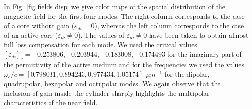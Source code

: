 \documentclass[9pt,twocolumn,twoside]{osajnl}
\begin{document}

In Fig. \ref{fig fields disp} we  give color maps of the spatial distribution of the magnetic field 
for the first four modes. The right column corresponds to the case of a core without gain ($\varepsilon_{di}=0$), whereas the left column corresponds to the case of an active core  ($\varepsilon_{di} \neq 0$). 
The values of $\varepsilon_{di} \neq 0$ have been taken to obtain almost full loss  compensation for each mode. 
We used the critical values $[\varepsilon_{di}]_c = -0.253806, -0.203944, -0.183008, -0.174493$ for the imaginary part of the permittivity of the active medium and for the frequencies we used the values $\omega_c/c = [0.798031, 0.894243, 0.977434, 1.05174] $  $\mu m^{-1}$ for the dipolar, quadrupolar, hexapolar and octupolar modes. We again observe that the inclusion of gain inside the cylinder  sharply highlights  the multipolar characteristics of the near field. 
%
%
%
%
\end{document}
